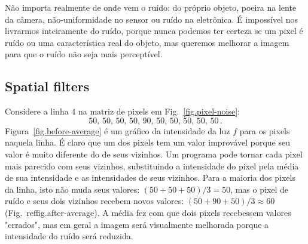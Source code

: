 
Não importa realmente de onde vem o ruído: do próprio objeto, poeira na lente da câmera, não-uniformidade no sensor ou ruído na eletrônica. É impossível nos livrarmos inteiramente do ruído, porque nunca podemos ter certeza se um pixel é ruído ou uma característica real do objeto, mas queremos melhorar a imagem para que o ruído não seja mais perceptível.

\subsection{Spatial filters}

Considere a linha $4$ na matriz de pixels em Fig.~\ref{fig.pixel-noise}:
\[
50,\, 50,\, 50,\,50,\, 90,\, 50,\, 50,\, 50,\, 50,\, 50\,.
\]
Figura~\ref{fig.before-average} é um gráfico da intensidade da luz $f$ para os pixels naquela linha. É claro que um dos pixels tem um valor improvável porque seu valor é muito diferente do de seus vizinhos. Um programa pode tornar cada pixel mais parecido com seus vizinhos, substituindo a intensidade do pixel pela média de sua intensidade e as intensidades de seus vizinhos. Para a maioria dos pixels da linha, isto não muda seus valores: $(50+50+50)/3=50$, mas o pixel de ruído e seus dois vizinhos recebem novos valores: $(50+90+50)/3\approx 60$ (Fig.~ref{fig.after-average}). A média fez com que dois pixels recebessem valores "errados", mas em geral a imagem será visualmente melhorada porque a intensidade do ruído será reduzida.

